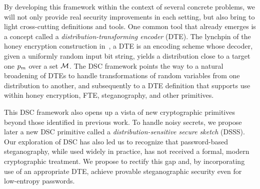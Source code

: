 {By developing this framework within the context of several concrete problems,
we will not only provide real security improvements in each setting, but also
bring to light cross-cutting definitions and tools. One common tool that
already emerges is a concept called a {\em distribution-transforming encoder}
(DTE). The lynchpin of the honey encryption construction
in~\cite{HoneyEnc-EC:2014}, a DTE is an encoding scheme whose decoder, given a
uniformly random input bit string, yields a distribution close to a target one
$p_m$ over a set ${\cal{M}}$. The DSC framework points the way to a natural
broadening of DTEs to handle transformations of random variables from one
distribution to another, and subsequently to a DTE definition that supports
use within honey encryption, FTE, steganography, and other primitives. 

This DSC framework also opens up a vista of new cryptographic primitives beyond
those identified in previous work. To handle noisy secrets, we propose later a
new DSC primitive called a {\em distribution-sensitive secure sketch} (DSSS).
Our exploration of DSC has also led us to recognize that password-based
steganography, while used widely in practice, has not received a formal, modern
cryptographic treatment. We propose to rectify this gap and, by incorporating use of an
appropriate DTE, achieve provable steganographic security even for low-entropy
passwords.  




}

